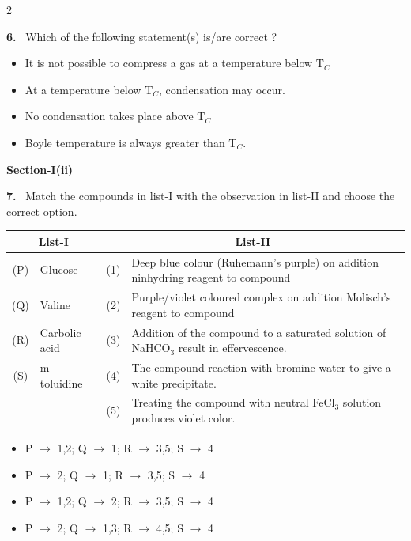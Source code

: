 \documentclass[10pt]{extarticle}
\newcommand{\sect}[1]{\par\smallskip\noindent\textbf{#1}\par}
\newcommand{\qn}[1]{\par\smallskip\noindent\textbf{#1.}~}
\newenvironment{qoptions}{\begin{itemize}[leftmargin=1.8em,itemsep=1pt,topsep=2pt,label={}]}{\end{itemize}}
\newcommand{\opt}[2]{\item[(#1)] #2}
\begin{document}
\begin{multicols}{2}
\qn{6} Which of the following statement(s) is/are correct ?
\begin{qoptions}
\opt{A}{It is not possible to compress a gas at a temperature below T$_C$}
\opt{B}{At a temperature below T$_C$, condensation may occur.}
\opt{C}{No condensation takes place above T$_C$}
\opt{D}{Boyle temperature is always greater than T$_C$.}
\end{qoptions}

\sect{Section-I(ii)}

\qn{7} Match the compounds in list-I with the observation in list-II and choose the correct option.\par\nobreak
\begin{center}\small\setlength{\tabcolsep}{3pt}
\begin{tabular}{|c|p{1.9cm}|c|p{3.9cm}|}
\hline
\multicolumn{2}{|c|}{\textbf{List-I}} & \multicolumn{2}{c|}{\textbf{List-II}} \\
\hline
(P) & Glucose & (1) & Deep blue colour (Ruhemann's purple) on addition ninhydring reagent to compound \\
\hline
(Q) & Valine & (2) & Purple/violet coloured complex on addition Molisch's reagent to compound \\
\hline
(R) & Carbolic acid & (3) & Addition of the compound to a saturated solution of NaHCO$_3$ result in effervescence. \\
\hline
(S) & m-toluidine & (4) & The compound reaction with bromine water to give a white precipitate. \\
\hline
 & & (5) & Treating the compound with neutral FeCl$_3$ solution produces violet color. \\
\hline
\end{tabular}
\end{center}
\begin{qoptions}
\opt{A}{P $\to$ 1,2; Q $\to$ 1; R $\to$ 3,5; S $\to$ 4}
\opt{B}{P $\to$ 2; Q $\to$ 1; R $\to$ 3,5; S $\to$ 4}
\opt{C}{P $\to$ 1,2; Q $\to$ 2; R $\to$ 3,5; S $\to$ 4}
\opt{D}{P $\to$ 2; Q $\to$ 1,3; R $\to$ 4,5; S $\to$ 4}
\end{qoptions}


\end{multicols}
\end{document}

